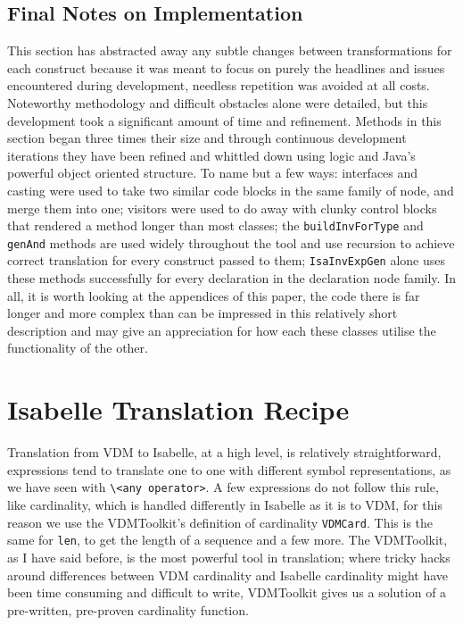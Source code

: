 	\subsection{Final Notes on Implementation}
	This section has abstracted away any subtle changes between transformations for each construct because it was meant to focus on purely the headlines and issues encountered during development, needless repetition was avoided at all costs. Noteworthy methodology and difficult obstacles alone were detailed, but this development took a significant amount of time and refinement. Methods in this section began three times their size and through continuous development iterations they have been refined and whittled down using logic and Java's powerful object oriented structure. To name but a few ways: interfaces and casting were used to take two similar code blocks in the same family of node, and merge them into one; visitors were used to do away with clunky control blocks that rendered a method longer than most classes; the \lstinline[language=Java]{buildInvForType} and \lstinline[language=Java]{genAnd} methods are used widely throughout the tool and use recursion to achieve correct translation for every construct passed to them; \lstinline[language=Java]{IsaInvExpGen} alone uses these methods successfully for every declaration in the declaration node family. In all, it is worth looking at the appendices of this paper, the code there is far longer and more complex than can be impressed in this relatively short description and may give an appreciation for how each these classes utilise the functionality of the other. 

	\section{Isabelle Translation Recipe} \label{itr}
	Translation from VDM to Isabelle, at a high level, is relatively straightforward, expressions tend to translate one to one with different symbol representations, as we have seen with \lstinline[language=Isabelle, mathescape]{\<any operator>}. A few expressions do not follow this rule, like cardinality, which is handled differently in Isabelle as it is to VDM, for this reason we use the VDMToolkit's definition of cardinality \lstinline[language=Java]{VDMCard}. This is the same for \lstinline[language=Java]{len}, to get the length of a sequence and a few more. The VDMToolkit, as I have said before, is the most powerful tool in translation; where tricky hacks around differences between VDM cardinality and Isabelle cardinality might have been time consuming and difficult to write, VDMToolkit gives us a solution of a pre-written, pre-proven cardinality function.

